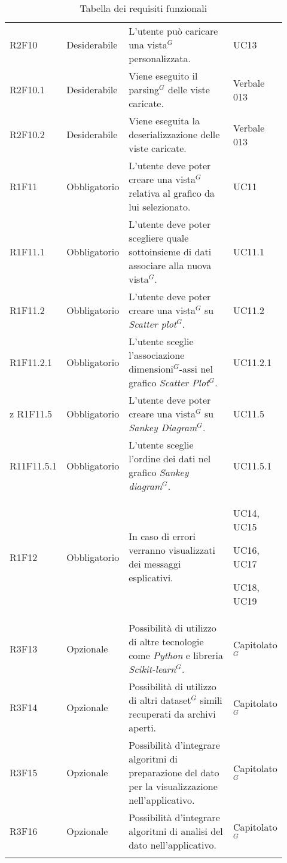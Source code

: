 {\begin{longtable}{p{0.12\linewidth}p{0.15\linewidth}p{0.50\linewidth}p{0.15\linewidth}}
    \rowcolor[RGB]{233, 245, 206}
    R2F10 & Desiderabile & L'utente può caricare una vista$^{G}$ personalizzata.  & UC13\\
    \rowcolor[RGB]{216, 235, 171}
    R2F10.1 & Desiderabile & Viene eseguito il parsing$^{G}$ delle viste caricate. & Verbale 013 \\
    \rowcolor[RGB]{233, 245, 206}
    R2F10.2 & Desiderabile & Viene eseguita la deserializzazione delle viste caricate. & Verbale 013 \\
    \rowcolor[RGB]{216, 235, 171}
    R1F11 & Obbligatorio & L'utente deve poter creare una vista$^{G}$ relativa al grafico da lui selezionato. & UC11\\
    \rowcolor[RGB]{233, 245, 206}
    R1F11.1 & Obbligatorio & L'utente deve poter scegliere quale sottoinsieme di dati associare alla nuova vista$^{G}$. & UC11.1\\
    \rowcolor[RGB]{216, 235, 171}
    R1F11.2 & Obbligatorio & L'utente deve poter creare una vista$^{G}$ su \textit{Scatter plot$^{G}$}. & UC11.2\\
    \rowcolor[RGB]{233, 245, 206}
    R1F11.2.1 & Obbligatorio & L'utente sceglie l'associazione dimensioni$^{G}$-assi nel grafico \textit{Scatter Plot$^{G}$}. & UC11.2.1\\
    \rowcolor[RGB]{216, 235, 171}z
    R1F11.5 & Obbligatorio & L'utente deve poter creare una vista$^{G}$ su \textit{Sankey Diagram$^{G}$}. & UC11.5\\
    \rowcolor[RGB]{216, 235, 171}
    R11F11.5.1 & Obbligatorio & L'utente sceglie l'ordine dei dati nel grafico \textit{Sankey diagram$^{G}$}. & UC11.5.1\\
    \rowcolor[RGB]{233, 245, 206}
    R1F12 & Obbligatorio & In caso di errori verranno visualizzati dei messaggi esplicativi. & UC14, UC15 \par UC16, UC17 \par UC18, UC19\\
    \rowcolor[RGB]{216, 235, 171}
    R3F13 & Opzionale & Possibilità di utilizzo di altre tecnologie come \textit{Python} e libreria \textit{Scikit-learn}$^{G}$.& Capitolato$^{G}$\\
    \rowcolor[RGB]{233, 245, 206}
    R3F14 & Opzionale & Possibilità di utilizzo di altri dataset$^{G}$ simili recuperati da archivi aperti. & Capitolato$^{G}$ \\
    \rowcolor[RGB]{216, 235, 171}
    R3F15 & Opzionale & Possibilità d'integrare algoritmi di preparazione del dato per la visualizzazione nell'applicativo. & Capitolato$^{G}$\\
    \rowcolor[RGB]{233, 245, 206}
    R3F16 & Opzionale & Possibilità d'integrare algoritmi di analisi del dato nell'applicativo. & Capitolato$^{G}$\\
    \caption{Tabella dei requisiti funzionali}

\end{longtable}
}


